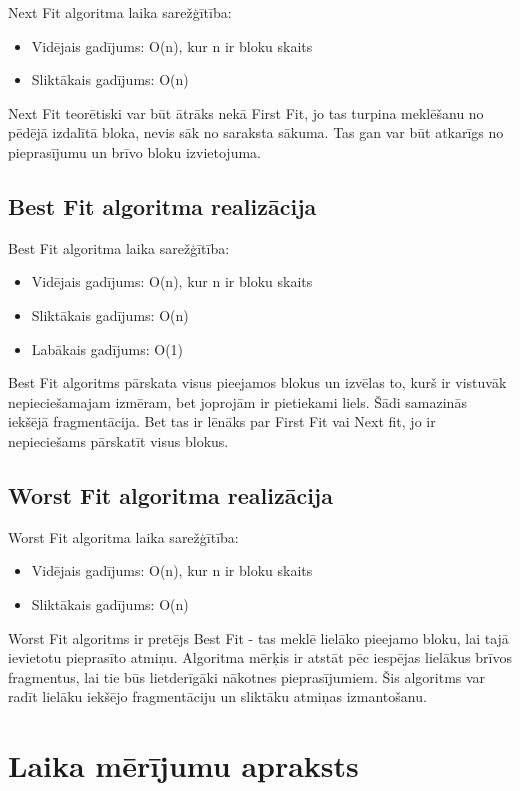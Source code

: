 \documentclass{report}
\begin{document}
	Next Fit algoritma laika sarežģītība:
	\begin{itemize}
		\item Vidējais gadījums: O(n), kur n ir bloku skaits
		\item Sliktākais gadījums: O(n)
	\end{itemize}
	
	Next Fit teorētiski var būt ātrāks nekā First Fit, jo tas turpina meklēšanu no pēdējā izdalītā bloka, nevis sāk no saraksta sākuma. Tas gan var būt atkarīgs no pieprasījumu un brīvo bloku izvietojuma. 
	
	\subsection{Best Fit algoritma realizācija}
	
	Best Fit algoritma laika sarežģītība:
	\begin{itemize}
		\item Vidējais gadījums: O(n), kur n ir bloku skaits
		\item Sliktākais gadījums: O(n)
		\item Labākais gadījums: O(1)
	\end{itemize}
	
	Best Fit algoritms pārskata visus pieejamos blokus un izvēlas to, kurš ir vistuvāk nepieciešamajam izmēram, bet joprojām ir pietiekami liels. Šādi samazinās iekšējā fragmentācija. Bet tas ir lēnāks par First Fit vai Next fit, jo ir nepieciešams pārskatīt visus blokus. 
	
	\subsection{Worst Fit algoritma realizācija}
	
	Worst Fit algoritma laika sarežģītība:
	\begin{itemize}
		\item Vidējais gadījums: O(n), kur n ir bloku skaits
		\item Sliktākais gadījums: O(n)
	\end{itemize}
	
	Worst Fit algoritms ir pretējs Best Fit - tas meklē lielāko pieejamo bloku, lai tajā ievietotu pieprasīto atmiņu. Algoritma mērķis ir atstāt pēc iespējas lielākus brīvos fragmentus, lai tie būs lietderīgāki nākotnes pieprasījumiem. Šis algoritms var radīt lielāku iekšējo fragmentāciju un sliktāku atmiņas izmantošanu.
	
	\section{Laika mērījumu apraksts}
	
\end{document}
